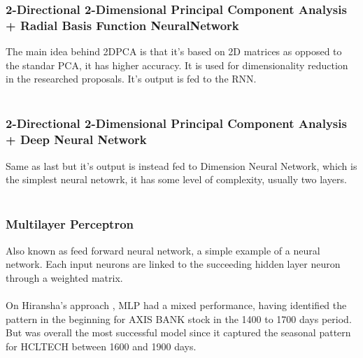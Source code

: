 \documentclass[conference]{IEEEtran}
\begin{document}
\subsubsection{2-Directional 2-Dimensional Principal Component Analysis + Radial Basis Function NeuralNetwork}
The main idea behind 2DPCA is that it's based on 2D matrices as opposed to the standar PCA, it has higher accuracy. It is used for dimensionality reduction in
the researched proposals. It's output is fed to the RNN.
\\\\
\subsubsection{2-Directional 2-Dimensional Principal Component Analysis + Deep Neural Network}
Same as last but it's output is instead fed to Dimension Neural Network, which is the simplest neural netowrk, it has some level of complexity, usually two layers.
\\\\
\subsubsection{Multilayer Perceptron}
Also known as feed forward neural network, a simple example of a neural network. Each input neurons are linked to the succeeding hidden layer neuron
through a weighted matrix.
\\\\
On Hiransha's approach \cite{M2018}, MLP had a mixed performance, having identified the pattern in the beginning for AXIS BANK stock in the 1400 to 1700 days period. But was overall the most successful model since it captured the seasonal pattern for HCLTECH between 1600 and 1900 days.
\\\\
\end{document}
